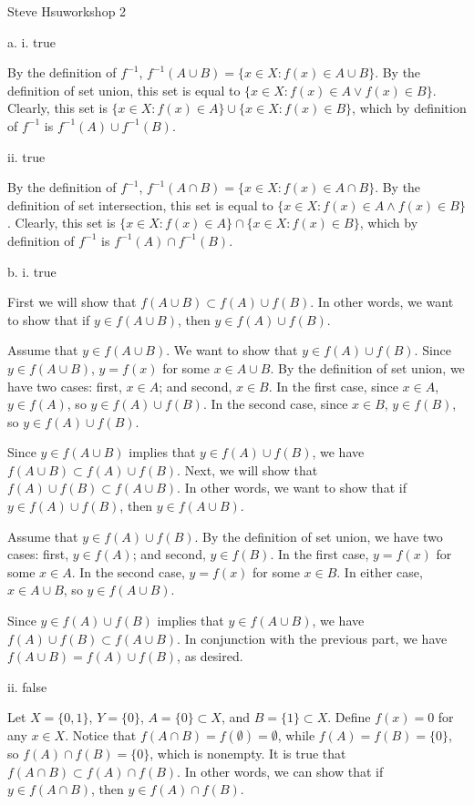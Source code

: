 \centerline{Steve Hsu\hfill workshop 2}
\item{a.} i. true

By the definition of $f^{-1}$,
$f^{-1}(A \cup B) = \{x \in X : f(x) \in A \cup B\}$.
By the definition of set union, this set is equal to
$\{x \in X : f(x) \in A \lor f(x) \in B\}$.
Clearly, this set is
$\{x \in X : f(x) \in A\} \cup \{x \in X : f(x) \in B\}$,
which by definition of $f^{-1}$ is $f^{-1}(A) \cup f^{-1}(B)$.
\bigskip
\item{} ii. true

By the definition of $f^{-1}$,
$f^{-1}(A \cap B) = \{x \in X : f(x) \in A \cap B\}$.
By the definition of set intersection, this set is equal to
$\{x \in X : f(x) \in A \land f(x) \in B\}$.
Clearly, this set is
$\{x \in X : f(x) \in A\} \cap \{x \in X : f(x) \in B\}$,
which by definition of $f^{-1}$ is $f^{-1}(A) \cap f^{-1}(B)$.
\bigskip
\item{b.} i. true

First we will show that $f(A \cup B) \subset f(A) \cup f(B)$.
In other words, we want to show that
if $y \in f(A \cup B)$, then $y \in f(A) \cup f(B)$.

Assume that $y \in f(A \cup B)$.
We want to show that $y \in f(A) \cup f(B)$.
Since $y \in f(A \cup B)$, $y = f(x)$ for some $x \in A \cup B$.
By the definition of set union, we have two cases:
first, $x \in A$; and second, $x \in B$.
In the first case, since $x \in A$, $y \in f(A)$,
so $y \in f(A) \cup f(B)$.
In the second case, since $x \in B$, $y \in f(B)$,
so $y \in f(A) \cup f(B)$.

Since $y \in f(A \cup B)$ implies that $y \in f(A) \cup f(B)$,
we have $f(A \cup B) \subset f(A) \cup f(B)$.
\medskip
Next, we will show that $f(A) \cup f(B) \subset f(A \cup B)$.
In other words, we want to show that
if $y \in f(A) \cup f(B)$, then $y \in f(A \cup B)$.

Assume that $y \in f(A) \cup f(B)$.
By the definition of set union, we have two cases:
first, $y \in f(A)$; and second, $y \in f(B)$.
In the first case, $y = f(x)$ for some $x \in A$.
In the second case, $y = f(x)$ for some $x \in B$.
In either case, $x \in A \cup B$, so $y \in f(A \cup B)$.

Since $y \in f(A) \cup f(B)$ implies that $y \in f(A \cup B)$,
we have $f(A) \cup f(B) \subset f(A \cup B)$.
In conjunction with the previous part, we have
$f(A \cup B) = f(A) \cup f(B)$, as desired.
\bigskip
\item{} ii. false

Let $X = \{0,1\}$, $Y = \{0\}$, $A = \{0\} \subset X$, and
$B = \{1\} \subset X$.
Define $f(x) = 0$ for any $x \in X$.
Notice that $f(A \cap B) = f(\emptyset) = \emptyset$,
while $f(A) = f(B) = \{0\}$, so $f(A) \cap f(B) = \{0\}$,
which is nonempty.
\medskip
It is true that $f(A \cap B) \subset f(A) \cap f(B)$.
In other words, we can show that
if $y \in f(A \cap B)$, then $y \in f(A) \cap f(B)$.

